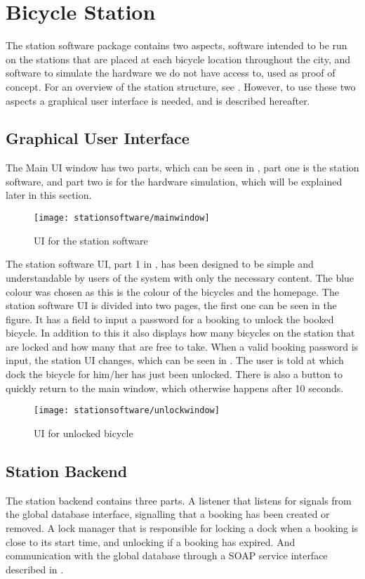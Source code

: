 \section{Bicycle Station}
The station software package contains two aspects, software intended to be run on the stations that are placed at each bicycle location throughout the city, and software to simulate the hardware we do not have access to, used as proof of concept.
For an overview of the station structure, see . 
However, to use these two aspects a graphical user interface is needed, and is described hereafter.

\subsection{Graphical User Interface}
The Main UI window has two parts, which can be seen in , part one is the station software, and part two is for the hardware simulation, which will be explained later in this section.

\begin{figure}[h]
	\centering
	\texttt{[image: stationsoftware/mainwindow]}
	\caption{UI for the station software}\label{fig:stationMain}
\end{figure}

The station software UI, part 1 in , has been designed to be simple and understandable by users of the system with only the necessary content.
The blue colour was chosen as this is the colour of the bicycles and the \bycykel homepage.
The station software UI is divided into two pages, the first one can be seen in the figure.
It has a field to input a password for a booking to unlock the booked bicycle.
In addition to this it also displays how many bicycles on the station that are locked and how many that are free to take.
When a valid booking password is input, the station UI changes, which can be seen in .
The user is told at which dock the bicycle for him/her has just been unlocked.
There is also a button to quickly return to the main window, which otherwise happens after 10 seconds.

\begin{figure}[h]
	\centering
	\texttt{[image: stationsoftware/unlockwindow]}
	\caption{UI for unlocked bicycle}\label{fig:bicycleUnlock}
\end{figure}


\subsection{Station Backend}
The station backend contains three parts.
A listener that listens for signals from the global database interface, signalling that a booking has been created or removed.
A lock manager that is responsible for locking a dock when a booking is close to its start time, and unlocking if a booking has expired.
And communication with the global database through a SOAP service interface described in .

